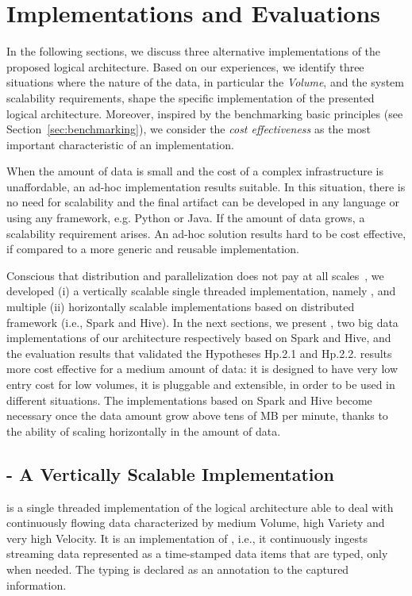\section{Implementations and Evaluations} \label{sec:comp-mod-impl}
In the following sections, we discuss three alternative implementations of the proposed logical architecture.
Based on our experiences, we identify three situations where the nature of the data, in particular the \textit{Volume}, and the system scalability requirements, shape the specific implementation of the presented logical architecture.
Moreover, inspired by the benchmarking basic principles (see Section~\ref{sec:benchmarking}), we consider the \textit{cost effectiveness} as the most important characteristic of an implementation.

When the amount of data is small and the cost of a complex infrastructure is unaffordable, an ad-hoc implementation results suitable.
In this situation, there is no need for scalability and the final artifact can be developed in any language or using any framework, e.g. Python or Java.
If the amount of data grows, a scalability requirement arises. An ad-hoc solution results hard to be cost effective, if compared to a more generic and reusable implementation. 

Conscious that distribution and parallelization does not pay at all scales~\cite{bodendistributed}, we developed (i) a vertically scalable single threaded implementation, namely \sti{}, and multiple (ii) horizontally scalable implementations based on distributed framework (i.e., Spark and Hive).
In the next sections, we present \sti{}, two big data implementations of our architecture respectively based on Spark and Hive, and the evaluation results that validated the Hypotheses \textsf{Hp.2.1} and \textsf{Hp.2.2}.
\sti{} results more cost effective for a medium amount of data: it is designed to have very low entry cost for low volumes, it is pluggable and extensible, in order to be used in different situations.
The implementations based on Spark and Hive become necessary once the data amount grow above tens of MB per minute, thanks to the ability of scaling horizontally in the amount of data.

\subsection{\sti{} - A Vertically Scalable Implementation} \label{sec:comp-mod-impl-v}
\sti{} is a single threaded implementation of the logical architecture able to deal with continuously flowing data characterized by medium Volume, high Variety and very high Velocity. It is an implementation of \river{}, i.e., it continuously ingests streaming data represented as a time-stamped data items that are typed, only when needed. The typing is declared as an annotation to the captured information.

